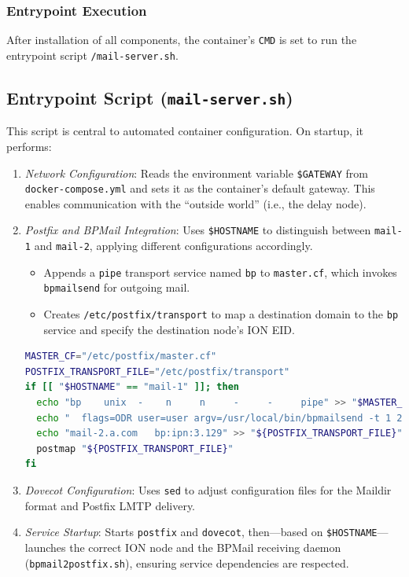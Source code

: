 \subsubsection*{Entrypoint Execution}
After installation of all components, the container's \texttt{CMD} is set to run the entrypoint script \texttt{/mail-server.sh}.

\subsection*{Entrypoint Script (\texttt{mail-server.sh})}
This script is central to automated container configuration. On startup, it performs:

\begin{enumerate}
  \item \textit{Network Configuration}: Reads the environment variable \texttt{\$GATEWAY} from \texttt{docker-compose.yml} and sets it as the container's default gateway. This enables communication with the ``outside world'' (i.e., the delay node).
  \item \textit{Postfix and BPMail Integration}: Uses \texttt{\$HOSTNAME} to distinguish between \texttt{mail-1} and \texttt{mail-2}, applying different configurations accordingly.
  \begin{itemize}
    \item Appends a \texttt{pipe} transport service named \texttt{bp} to \texttt{master.cf}, which invokes \texttt{bpmailsend} for outgoing mail.
    \item Creates \texttt{/etc/postfix/transport} to map a destination domain to the \texttt{bp} service and specify the destination node's ION EID.
  \end{itemize}

  \begin{lstlisting}[language=bash,caption={Example snippet for \texttt{mail-1}}]
MASTER_CF="/etc/postfix/master.cf"
POSTFIX_TRANSPORT_FILE="/etc/postfix/transport"
if [[ "$HOSTNAME" == "mail-1" ]]; then
  echo "bp    unix  -    n     n     -     -     pipe" >> "$MASTER_CF"
  echo "  flags=ODR user=user argv=/usr/local/bin/bpmailsend -t 1 21 ${nexthop}" >> "$MASTER_CF"
  echo "mail-2.a.com   bp:ipn:3.129" >> "${POSTFIX_TRANSPORT_FILE}"
  postmap "${POSTFIX_TRANSPORT_FILE}"
fi
  \end{lstlisting}

  \item \textit{Dovecot Configuration}: Uses \texttt{sed} to adjust configuration files for the Maildir format and Postfix LMTP delivery.
  \item \textit{Service Startup}: Starts \texttt{postfix} and \texttt{dovecot}, then—based on \texttt{\$HOSTNAME}—launches the correct ION node and the BPMail receiving daemon (\texttt{bpmail2postfix.sh}), ensuring service dependencies are respected.
\end{enumerate}


